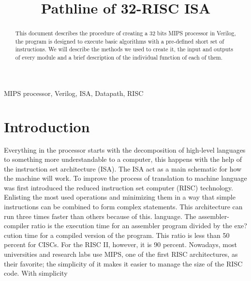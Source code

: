 \documentclass[conference]{IEEEtran}
\begin{document}
\title{Pathline of 32-RISC ISA\\}

\author{
\and
{}
}
\maketitle

\begin{abstract}
This document describes the procedure of creating a 32 bits MIPS processor in Verilog, the program is designed to execute basic algorithms with a pre-defined short set of instructions. We will describe the methods we used to create it, the input and outputs of every module and a brief description of the individual function of each of them.
\end{abstract}

\begin{IEEEkeywords}
MIPS processor, Verilog, ISA, Datapath, RISC
\end{IEEEkeywords}

\section{Introduction}
Everything in the processor starts with the decomposition of high-level languages to something more understandable to a computer, this happens with the help of the instruction set architecture (ISA). The ISA act as a main schematic for how the machine will work. To improve the process of translation to machine language was first introduced the reduced instruction set computer (RISC) technology. Enlisting the most used operations and minimizing them in a way that simple instructions can be combined to form complex statements. This architecture can run three times faster than others because of this. language. The assembler-compiler ratio is the
execution time for an assembler program divided by the exe?
cution time for a compiled version of the program. This ratio is
less than 50 percent for CISCs. For the RISC II, however, it is 90
percent.\cite{10.2307/29774812} Nowadays, most universities and research labs use MIPS, one of the first RISC architectures, as their favorite;  the simplicity of it makes it easier to manage the size of the RISC code. With simplicity
\end{document}
